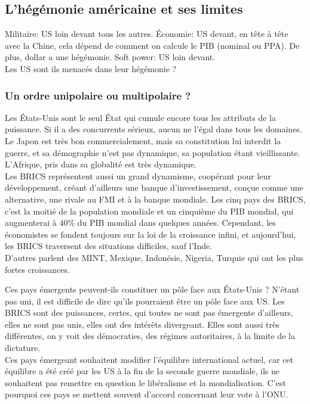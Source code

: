 \documentclass[10pt, a4paper, openany]{book}
\begin{document}
\subsection{L'hégémonie américaine et ses limites}

Militaire: US loin devant tous les autres. Économie: US devant, en tête à tête avec la Chine, cela dépend de comment on calcule le PIB (nominal ou PPA). De plus, dollar a une hégémonie. Soft power: US loin devant. \\
Les US sont ils menacés dans leur hégémonie ? 

\subsubsection{Un ordre unipolaire ou multipolaire ?}

Les États-Unis sont le seul État qui cumule encore tous les attributs de la puissance. Si il a des concurrents sérieux, aucun ne l'égal dans tous les domaines. \\
Le Japon est très bon commercialement, mais sa constitution lui interdit la guerre, et sa démographie n'est pas dynamique, sa population étant vieillissante. L'Afrique, pris dans sa globalité est très dynamique. \\
Les BRICS représentent aussi un grand dynamisme, coopérant pour leur développement, créant d'ailleurs une banque d'investissement, conçue comme une alternative, une rivale au FMI et à la banque mondiale. Les cinq pays des BRICS, c'est la moitié de la population mondiale et un cinquième du PIB mondial, qui augmenterai à 40\% du PIB mondial dans quelques années. Cependant, les économistes se fondent toujours sur la loi de la croissance infini, et aujourd'hui, les BRICS traversent des situations difficiles, sauf l'Inde. \\
D'autres parlent des MINT, Mexique, Indonésie, Nigeria, Turquie qui ont les plus fortes croissances.


Ces pays émergents peuvent-ils constituer un pôle face aux États-Unis ? N'étant pas uni, il est difficile de dire qu'ils pourraient être un pôle face aux US. Les BRICS sont des puissances, certes, qui toutes ne sont pas émergente d'ailleurs, elles ne sont pas unis, elles ont des intérêts divergeant. Elles sont aussi très différentes, on y voit des démocraties, des régimes autoritaires, à la limite de la dictature. \\
Ces pays émergeant souhaitent modifier l'équilibre international actuel, car cet équilibre a été créé par les US à la fin de la seconde guerre mondiale, ils ne souhaitent pas remettre en question le libéralisme et la mondialisation. C'est pourquoi ces pays se mettent souvent d'accord concernant leur vote à l'ONU. 
\end{document}
